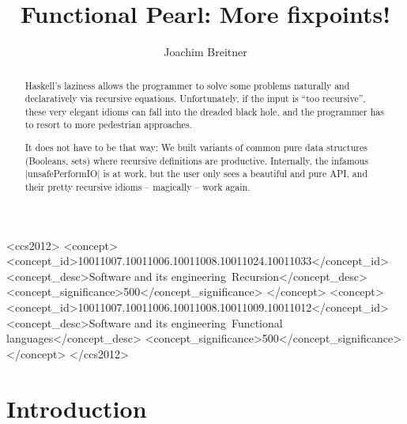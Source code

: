 \documentclass[manuscript,review,screen,acmsmall]{acmart}
\begin{document}
\title{Functional Pearl: More fixpoints!}

\author{Joachim Breitner}


\begin{abstract}
Haskell’s laziness allows the programmer to solve some problems naturally and declaratively via recursive equations. Unfortunately, if the input is “too recursive”, these very elegant idioms can fall into the dreaded black hole, and the programmer has to resort to more pedestrian approaches.

It does not have to be that way: We built variants of common pure data structures (Booleans, sets) where recursive definitions are productive. Internally, the infamous |unsafePerformIO| is at work, but the user only sees a beautiful and pure API, and their pretty recursive idioms -- magically -- work again.

\end{abstract}

\begin{CCSXML}
<ccs2012>
   <concept>
       <concept_id>10011007.10011006.10011008.10011024.10011033</concept_id>
       <concept_desc>Software and its engineering~Recursion</concept_desc>
       <concept_significance>500</concept_significance>
       </concept>
   <concept>
       <concept_id>10011007.10011006.10011008.10011009.10011012</concept_id>
       <concept_desc>Software and its engineering~Functional languages</concept_desc>
       <concept_significance>500</concept_significance>
       </concept>
 </ccs2012>
\end{CCSXML}



\maketitle

\section{Introduction}
\end{document}
